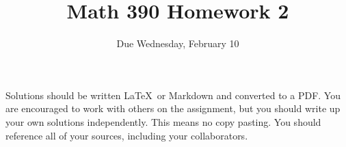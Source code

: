\documentclass{article}
\title{Math 390 Homework 2}
\author{Due Wednesday, February 10}
\date{}
\begin{document}

\maketitle

\setlength{\parindent}{0em} %
\setlength{\parskip}{1em} %



Solutions should be written \LaTeX\ or Markdown and converted to a PDF. You are encouraged to work with others
on the assignment, but you should write up your own solutions independently. This means no copy pasting. You should
reference all of your sources, including your collaborators. 
\end{document}
